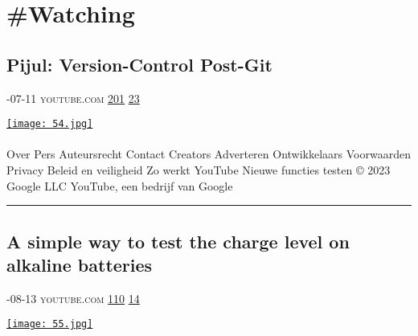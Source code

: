 \documentclass[10pt,a4paper]{article}
\begin{document}
\newpage
\section{\#Watching}

\begin{multicols}{2}

\noindent\begin{minipage}{\linewidth}
\subsection{Pijul: Version-Control Post-Git}
\textsc{\footnotesize
{\scriptsize\faCalendar}-07-11 
{\scriptsize\faYoutube}\space 
youtube.com 
{\scriptsize\faThumbsOUp}\space 
\href{http://news.ycombinator.com/item?id=37094599\&utm\_term=comment}{201} 
{\scriptsize\faComments}\space 
\href{http://news.ycombinator.com/item?id=37094599\&utm\_term=comment}{23} 
}
\par\medskip\noindent
\href{https://www.youtube.com/watch?v=7MpdZkGj5AI\&utm\_source=hackernewsletter\&utm\_medium=email\&utm\_term=watching}{
    \texttt{[image: 54.jpg]}
}
\end{minipage}
\paragraph{}
Over
Pers
Auteursrecht
Contact
Creators
Adverteren
Ontwikkelaars
Voorwaarden
Privacy
Beleid en veiligheid
Zo werkt YouTube
Nieuwe functies testen
© 2023 Google LLC
YouTube, een bedrijf van Google
\par\noindent\textcolor{red}{\rule{\linewidth}{0.2mm}}
\vfill
\null
\noindent\begin{minipage}{\linewidth}
\subsection{A simple way to test the charge level on alkaline batteries}
\textsc{\footnotesize
{\scriptsize\faCalendar}-08-13 
{\scriptsize\faYoutube}\space 
youtube.com 
{\scriptsize\faThumbsOUp}\space 
\href{http://news.ycombinator.com/item?id=37155657\&utm\_term=comment}{110} 
{\scriptsize\faComments}\space 
\href{http://news.ycombinator.com/item?id=37155657\&utm\_term=comment}{14} 
}
\par\medskip\noindent
\href{https://www.youtube.com/watch?v=nwfFBUVxpac\&utm\_source=hackernewsletter\&utm\_medium=email\&utm\_term=watching}{
    \texttt{[image: 55.jpg]}
}
\end{minipage}

\end{multicols}
\end{document}
